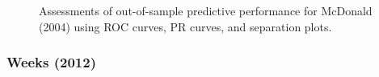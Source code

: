 \begin{figure}
	\centering   
	\caption{Assessments of out-of-sample predictive performance for McDonald (2004) using ROC curves, PR curves, and separation plots.}
\end{figure}
\FloatBarrier
\clearpage



% 


\subsubsection*{Weeks (2012)}

